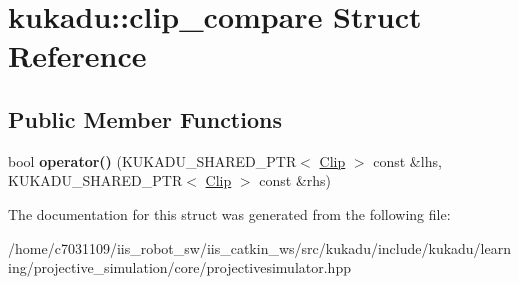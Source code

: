 \hypertarget{structkukadu_1_1clip__compare}{\section{kukadu\-:\-:clip\-\_\-compare Struct Reference}
\label{structkukadu_1_1clip__compare}
}
\subsection*{Public Member Functions}
\begin{DoxyCompactItemize}
\item 
\hypertarget{structkukadu_1_1clip__compare_a00cb7898ad240af31cf9ca301ae7b7ad}{bool {\bfseries operator()} (K\-U\-K\-A\-D\-U\-\_\-\-S\-H\-A\-R\-E\-D\-\_\-\-P\-T\-R$<$ \hyperlink{classkukadu_1_1Clip}{Clip} $>$ const \&lhs, K\-U\-K\-A\-D\-U\-\_\-\-S\-H\-A\-R\-E\-D\-\_\-\-P\-T\-R$<$ \hyperlink{classkukadu_1_1Clip}{Clip} $>$ const \&rhs)}\label{structkukadu_1_1clip__compare_a00cb7898ad240af31cf9ca301ae7b7ad}

\end{DoxyCompactItemize}


The documentation for this struct was generated from the following file\-:\begin{DoxyCompactItemize}
\item 
/home/c7031109/iis\-\_\-robot\-\_\-sw/iis\-\_\-catkin\-\_\-ws/src/kukadu/include/kukadu/learning/projective\-\_\-simulation/core/projectivesimulator.\-hpp\end{DoxyCompactItemize}
